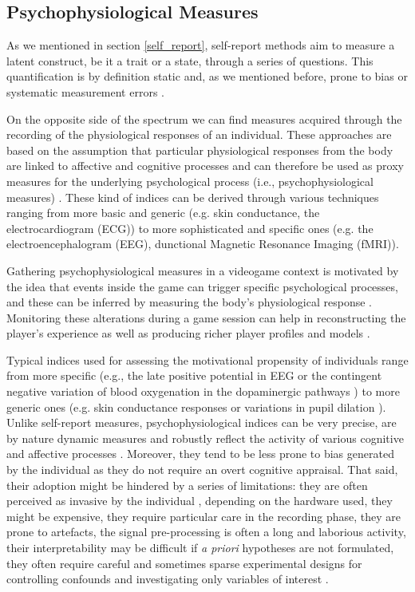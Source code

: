 \subsection{Psychophysiological Measures}
\label{psychophisio} 
As we mentioned in section \ref{self_report}, self-report methods aim to measure a latent construct, be it a trait or a state, through a series of questions. This quantification is by definition static and, as we mentioned before, prone to bias or systematic measurement errors \cite{van2009psychologically}. 

On the opposite side of the spectrum we can find measures acquired through the recording of the physiological responses of an individual. These approaches are based on the assumption that particular physiological responses from the body are linked to affective and cognitive processes and can therefore be used as proxy measures for the underlying psychological process (i.e., psychophysiological measures) \cite{cacioppo2007handbook}. These kind of indices can be derived through various techniques ranging from more basic and generic (e.g. skin conductance, the electrocardiogram (ECG)) to more sophisticated and specific ones (e.g. the electroencephalogram (EEG), dunctional Magnetic Resonance Imaging (fMRI)). 

Gathering psychophysiological measures in a videogame context is motivated by the idea that events inside the game can trigger specific psychological processes, and these can be inferred by measuring the body’s physiological response \cite{yannakakis2013player, drachen2018games}. Monitoring these  alterations during a game session can help in reconstructing the player's experience \cite{mirza2013does} as well as producing richer player profiles and models \cite{yannakakis2013player}. 

Typical indices used for assessing the motivational propensity of individuals range from more specific (e.g., the late positive potential in EEG or the contingent negative variation of blood oxygenation in the dopaminergic pathways \cite{cacioppo2007handbook}) to more generic ones (e.g. skin conductance responses or variations in pupil dilation \cite{cacioppo2007handbook}). Unlike self-report measures, psychophysiological indices can be very precise, are by nature dynamic measures and robustly reflect the activity of various cognitive and affective processes \cite{cacioppo2007handbook}. Moreover, they tend to be less prone to bias generated by the individual as they do not require an overt cognitive appraisal. That said, their adoption might be hindered by a series of limitations: they are often perceived as invasive by the individual \cite{yannakakis2013player}, depending on the hardware used, they might be expensive, they require particular care in the recording phase, they are prone to artefacts, the signal pre-processing is often a long and laborious activity, their interpretability may be difficult if  \textit{a priori} hypotheses are not formulated, they often require careful and sometimes sparse experimental designs for controlling confounds and investigating only variables of interest \cite{liu2017toward}.
    
